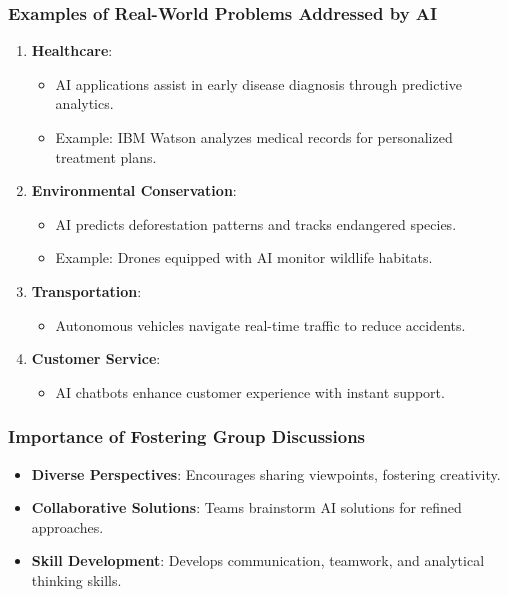 \documentclass{beamer}
\begin{document}
\begin{frame}[fragile]
    \frametitle{Examples of Real-World Problems Addressed by AI}
    \begin{enumerate}
        \item \textbf{Healthcare}:
            \begin{itemize}
                \item AI applications assist in early disease diagnosis through predictive analytics.
                \item Example: IBM Watson analyzes medical records for personalized treatment plans.
            \end{itemize}
        \item \textbf{Environmental Conservation}:
            \begin{itemize}
                \item AI predicts deforestation patterns and tracks endangered species.
                \item Example: Drones equipped with AI monitor wildlife habitats.
            \end{itemize}
        \item \textbf{Transportation}:
            \begin{itemize}
                \item Autonomous vehicles navigate real-time traffic to reduce accidents.
            \end{itemize}
        \item \textbf{Customer Service}:
            \begin{itemize}
                \item AI chatbots enhance customer experience with instant support.
            \end{itemize}
    \end{enumerate}
\end{frame}

\begin{frame}[fragile]
    \frametitle{Importance of Fostering Group Discussions}
    \begin{itemize}
        \item \textbf{Diverse Perspectives}: Encourages sharing viewpoints, fostering creativity.
        \item \textbf{Collaborative Solutions}: Teams brainstorm AI solutions for refined approaches.
        \item \textbf{Skill Development}: Develops communication, teamwork, and analytical thinking skills.
    \end{itemize}
\end{frame}
\end{document}
